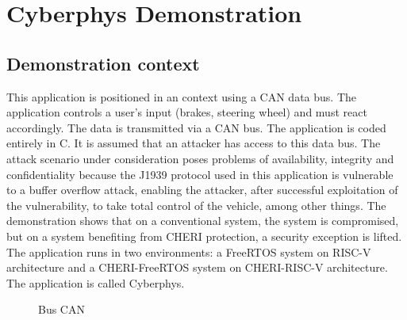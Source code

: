 \documentclass[a4paper, 11pt]{article}
\begin{document}
\section{Cyberphys Demonstration}
\subsection{Demonstration context}
This application is positioned in an  context using a CAN data bus. The application controls a user's input (brakes, steering wheel) and must react accordingly. The data is transmitted via a CAN bus.
The application is coded entirely in C.
It is assumed that an attacker has access to this data bus. The attack scenario under consideration poses problems of availability, integrity and confidentiality because the J1939 protocol used in this application is vulnerable to a buffer overflow attack, enabling the attacker, after successful exploitation of the vulnerability, to take total control of the vehicle, among other things. The demonstration shows that on a conventional system, the system is compromised, but on a system benefiting from CHERI protection, a security exception is lifted. \\
The application runs in two environments: a FreeRTOS system on RISC-V architecture and a CHERI-FreeRTOS system on CHERI-RISC-V architecture. The application is called Cyberphys.
\begin{figure}
        \begin{center}
        \end{center}
        \caption{Bus CAN} 
		\label{fig:canbus}

\end{figure}
\end{document}
